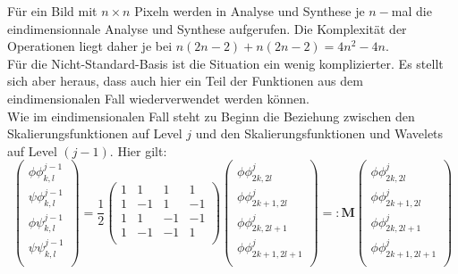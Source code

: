 \noindent Für ein Bild mit $n \times n$ Pixeln werden in Analyse und Synthese je $n-$mal die eindimensionnale Analyse und Synthese aufgerufen. Die Komplexität der Operationen liegt daher je bei $n(2n-2) + n(2n-2) = 4n^2-4n$.
\\
Für die Nicht-Standard-Basis ist die Situation ein wenig komplizierter. Es stellt sich aber heraus, dass auch hier ein Teil der Funktionen aus dem eindimensionalen Fall wiederverwendet werden können.\\
Wie im eindimensionalen Fall steht zu Beginn die Beziehung zwischen den Skalierungsfunktionen auf Level $j$ und den Skalierungsfunktionen und Wavelets auf Level $(j-1)$. Hier gilt:
%
%
\[
\begin{pmatrix}
\phi\phi_{k,l}^{j-1} \\
\psi\phi_{k,l}^{j-1} \\
\phi\psi_{k,l}^{j-1} \\
\psi\psi_{k,l}^{j-1} \\
\end{pmatrix}
= \frac{1}{2}
\begin{pmatrix}
1 & 1 & 1 & 1 \\
1 & -1 & 1 & -1 \\
1 & 1 & -1 & -1 \\
1 & -1 & -1 & 1 \\
\end{pmatrix}
\begin{pmatrix}
\phi\phi_{2k,2l}^{j} \\
\phi\phi_{2k+1,2l}^{j} \\
\phi\phi_{2k,2l+1}^{j} \\
\phi\phi_{2k+1,2l+1}^{j} \\
\end{pmatrix}
=:
\mathbf{M}
\begin{pmatrix}
\phi\phi_{2k,2l}^{j} \\
\phi\phi_{2k+1,2l}^{j} \\
\phi\phi_{2k,2l+1}^{j} \\
\phi\phi_{2k+1,2l+1}^{j} \\
\end{pmatrix}
\]
